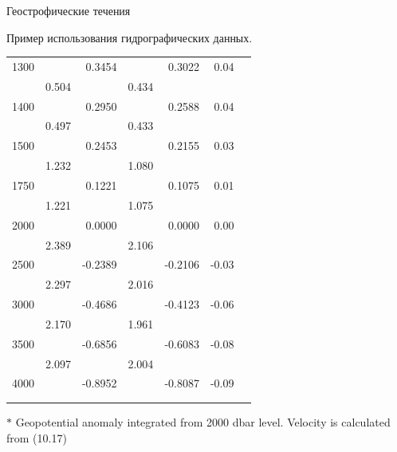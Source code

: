 \begin{chapter}{Геострофические течения}
\begin{section}{Пример использования гидрографических данных.}
\begin{table}[t!]
\begin{center}
\begin{small}
\begin{tabular}{rrrrrrl}
1300&             & 0.3454&        &    0.3022& 0.04\\
 &      0.504  &       & 0.434              \\
1400&             & 0.2950&        &    0.2588& 0.04\\
 &      0.497  &       & 0.433              \\
1500&             & 0.2453&        &    0.2155& 0.03\\
 &      1.232  &       & 1.080              \\
1750&             & 0.1221&        &    0.1075& 0.01\\
 &      1.221  &       & 1.075              \\
2000&             & 0.0000&        &    0.0000& 0.00\\
 &      2.389  &       & 2.106              \\
2500&             & -0.2389&       & -0.2106& -0.03\\
 &      2.297  &       & 2.016              \\
3000&             & -0.4686&       & -0.4123& -0.06\\
 &      2.170  &       & 1.961              \\
3500&             & -0.6856&       & -0.6083& -0.08\\
 &      2.097  &       & 2.004              \\
4000&             & -0.8952&       & -0.8087& -0.09\\
\rule[-1ex]{0mm}{1ex}&  \\
\hline
\rule[-1ex]{0mm}{1ex}&  \\
\end{tabular}
\end{small}

$\ast$ Geopotential anomaly integrated from 2000 dbar level.
Velocity is calculated from (10.17)
\end{center}
\end{table}


\end{section}
\end{chapter}
